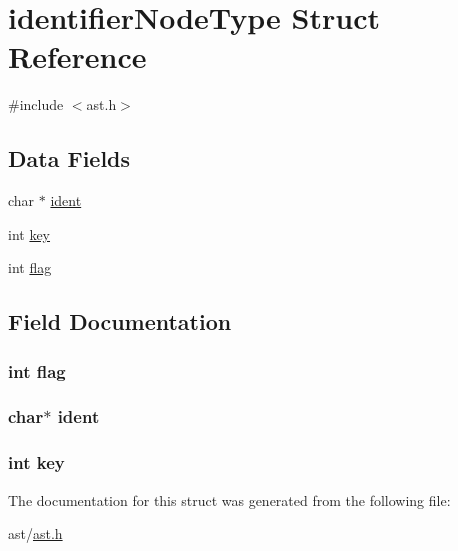 \hypertarget{structidentifier_node_type}{}\section{identifier\+Node\+Type Struct Reference}
\label{structidentifier_node_type}


{\ttfamily \#include $<$ast.\+h$>$}

\subsection*{Data Fields}
\begin{DoxyCompactItemize}
\item 
char $\ast$ \hyperlink{structidentifier_node_type_a25164f805d9af841d8063fe86f5e1da4}{ident}
\item 
int \hyperlink{structidentifier_node_type_a35af0be900467fedbb610bd6ea65ed78}{key}
\item 
int \hyperlink{structidentifier_node_type_adf916204820072417ed73a32de1cefcf}{flag}
\end{DoxyCompactItemize}


\subsection{Field Documentation}
\subsubsection[{\texorpdfstring{flag}{flag}}]{\setlength{\rightskip}{0pt plus 5cm}int flag}\hypertarget{structidentifier_node_type_adf916204820072417ed73a32de1cefcf}{}\label{structidentifier_node_type_adf916204820072417ed73a32de1cefcf}
\subsubsection[{\texorpdfstring{ident}{ident}}]{\setlength{\rightskip}{0pt plus 5cm}char$\ast$ ident}\hypertarget{structidentifier_node_type_a25164f805d9af841d8063fe86f5e1da4}{}\label{structidentifier_node_type_a25164f805d9af841d8063fe86f5e1da4}
\subsubsection[{\texorpdfstring{key}{key}}]{\setlength{\rightskip}{0pt plus 5cm}int key}\hypertarget{structidentifier_node_type_a35af0be900467fedbb610bd6ea65ed78}{}\label{structidentifier_node_type_a35af0be900467fedbb610bd6ea65ed78}


The documentation for this struct was generated from the following file\+:\begin{DoxyCompactItemize}
\item 
ast/\hyperlink{ast_8h}{ast.\+h}\end{DoxyCompactItemize}
